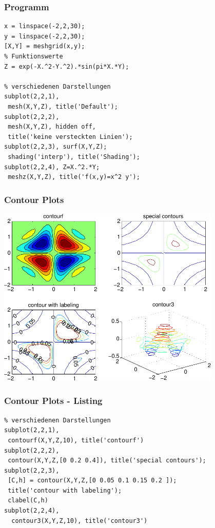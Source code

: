 % 
% 
\begin{frame}[fragile]\frametitle{Programm}
\begin{lstlisting}
x = linspace(-2,2,30);
y = linspace(-2,2,30);
[X,Y] = meshgrid(x,y);
% Funktionswerte
Z = exp(-X.^2-Y.^2).*sin(pi*X.*Y);

% verschiedenen Darstellungen
subplot(2,2,1),
 mesh(X,Y,Z), title('Default');
subplot(2,2,2),
 mesh(X,Y,Z), hidden off,
 title('keine versteckten Linien');
subplot(2,2,3), surf(X,Y,Z);
 shading('interp'), title('Shading');
subplot(2,2,4), Z=X.^2.*Y;
 meshz(X,Y,Z), title('f(x,y)=x^2 y');
\end{lstlisting}
\end{frame}

% 
% 
\begin{frame}[fragile]\frametitle{Contour Plots}
\hfil\includegraphics[width=0.8\textwidth]{./figures/beispiel_function_plot_contour}\hfil
\end{frame}
% 
% 
\begin{frame}[fragile]\frametitle{Contour Plots - Listing}
\begin{lstlisting}
% verschiedenen Darstellungen
subplot(2,2,1),
 contourf(X,Y,Z,10), title('contourf')
subplot(2,2,2),
 contour(X,Y,Z,[0 0.2 0.4]), title('special contours');
subplot(2,2,3),
 [C,h] = contour(X,Y,Z,[0 0.05 0.1 0.15 0.2 ]); 
 title('contour with labeling');
 clabel(C,h)
subplot(2,2,4),
  contour3(X,Y,Z,10), title('contour3')
\end{lstlisting}
\end{frame}

